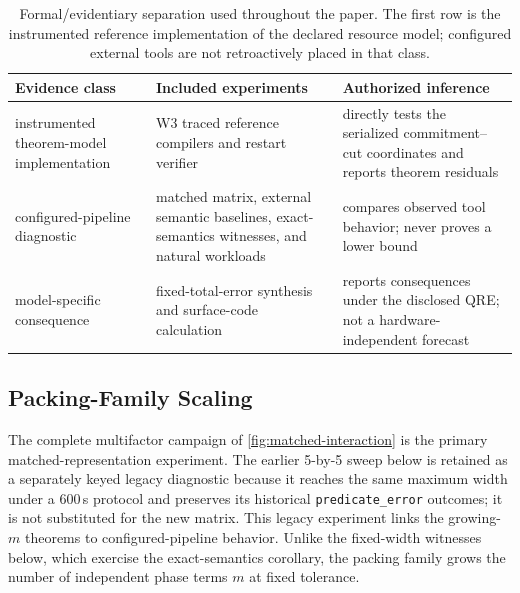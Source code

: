 \documentclass[aps,prx,reprint,floatfix,superscriptaddress]{revtex4-2}
\begin{document}
\begin{table}[!t]
\centering
\small
\setlength{\tabcolsep}{4pt}
\begin{tabularx}{\textwidth}{@{}l X X@{}}
\toprule
Evidence class & Included experiments & Authorized inference \\
\midrule
instrumented theorem-model implementation & W3 traced reference compilers and restart verifier & directly tests the serialized commitment--cut coordinates and reports theorem residuals \\
configured-pipeline diagnostic & matched matrix, external semantic baselines, exact-semantics witnesses, and natural workloads & compares observed tool behavior; never proves a lower bound \\
model-specific consequence & fixed-total-error synthesis and surface-code calculation & reports consequences under the disclosed QRE; not a hardware-independent forecast \\
\bottomrule
\end{tabularx}
\caption{Formal/evidentiary separation used throughout the paper.  The first
row is the instrumented reference implementation of the declared resource
model; configured external tools are not retroactively placed in that class.}
\label{tab:evidence-classes}
\end{table}

\subsection{Packing-Family Scaling}
\label{sec:packing-scaling}

The complete multifactor campaign of \cref{fig:matched-interaction}
is the primary matched-representation experiment.  The earlier 5-by-5 sweep
below is retained as a separately keyed legacy diagnostic because it reaches
the same maximum width under a 600\,s protocol and preserves its historical
\texttt{predicate\_error} outcomes; it is not substituted for the new matrix.
This legacy experiment links the growing-$m$ theorems to configured-pipeline
behavior. Unlike the fixed-width witnesses below, which exercise the
exact-semantics corollary, the packing family grows the number of
independent phase terms $m$ at fixed tolerance.
\end{document}
